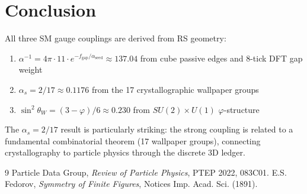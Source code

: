 \documentclass[12pt,a4paper]{article}
\theoremstyle{definition}
\theoremstyle{remark}
\begin{document}
\section{Conclusion}

All three SM gauge couplings are derived from RS geometry:
\begin{enumerate}
\item $\alpha^{-1} = 4\pi \cdot 11 \cdot e^{-f_\mathrm{gap}/\alpha_\mathrm{seed}} \approx 137.04$ 
from cube passive edges and 8-tick DFT gap weight
\item $\alpha_s = 2/17 \approx 0.1176$ from the 17 crystallographic wallpaper groups
\item $\sin^2\theta_W = (3-\varphi)/6 \approx 0.230$ from $SU(2)\times U(1)$ $\varphi$-structure
\end{enumerate}

The $\alpha_s = 2/17$ result is particularly striking: the strong coupling is related 
to a fundamental combinatorial theorem (17 wallpaper groups), connecting crystallography 
to particle physics through the discrete 3D ledger.

\begin{thebibliography}{9}
 Particle Data Group, \emph{Review of Particle Physics}, PTEP 2022, 083C01.
 E.S. Fedorov, \emph{Symmetry of Finite Figures}, Notices Imp. Acad. Sci. (1891).
\end{thebibliography}
\end{document}
